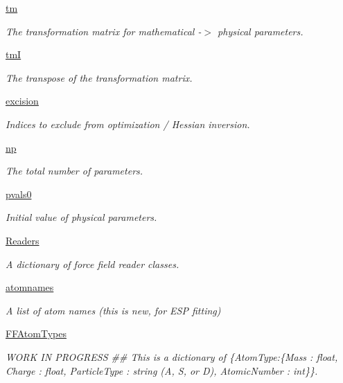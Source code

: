 \begin{DoxyCompactItemize}
\hyperlink{classsrc_1_1ffyapf_1_1FF_ad1fce7db160144f58504671f0a7dd3d6}{tm}
\begin{DoxyCompactList}\small\item\em The transformation matrix for mathematical -\/$>$ physical parameters. \end{DoxyCompactList}\item 
\hyperlink{classsrc_1_1ffyapf_1_1FF_a1cb1c9305460432c3503ba9b7394acc5}{tmI}
\begin{DoxyCompactList}\small\item\em The transpose of the transformation matrix. \end{DoxyCompactList}\item 
\hyperlink{classsrc_1_1ffyapf_1_1FF_acdf033be42f6827dbd150984f52f4076}{excision}
\begin{DoxyCompactList}\small\item\em Indices to exclude from optimization / Hessian inversion. \end{DoxyCompactList}\item 
\hyperlink{classsrc_1_1ffyapf_1_1FF_a29e74447e815d30b95c0fdb6beb56bbb}{np}
\begin{DoxyCompactList}\small\item\em The total number of parameters. \end{DoxyCompactList}\item 
\hyperlink{classsrc_1_1ffyapf_1_1FF_af59602ddb21a54c130b0b732e99eae67}{pvals0}
\begin{DoxyCompactList}\small\item\em Initial value of physical parameters. \end{DoxyCompactList}\item 
\hyperlink{classsrc_1_1ffyapf_1_1FF_a1ec5e078dd2f588a788164f7c8999e4d}{Readers}
\begin{DoxyCompactList}\small\item\em A dictionary of force field reader classes. \end{DoxyCompactList}\item 
\hyperlink{classsrc_1_1ffyapf_1_1FF_acf7da953fc17d47f0980400b8053712b}{atomnames}
\begin{DoxyCompactList}\small\item\em A list of atom names (this is new, for E\+SP fitting) \end{DoxyCompactList}\item 
\hyperlink{classsrc_1_1ffyapf_1_1FF_a978f71c36052e6e8d93da8baeef6c3d1}{F\+F\+Atom\+Types}
\begin{DoxyCompactList}\small\item\em W\+O\+RK IN P\+R\+O\+G\+R\+E\+SS \#\# This is a dictionary of \{\textquotesingle{}Atom\+Type\textquotesingle{}\+:\{\textquotesingle{}Mass\textquotesingle{} \+: float, \textquotesingle{}Charge\textquotesingle{} \+: float, \textquotesingle{}Particle\+Type\textquotesingle{} \+: string (\textquotesingle{}A\textquotesingle{}, \textquotesingle{}S\textquotesingle{}, or \textquotesingle{}D\textquotesingle{}), \textquotesingle{}Atomic\+Number\textquotesingle{} \+: int\}\}. \end{DoxyCompactList}\item 

\end{DoxyCompactItemize}
